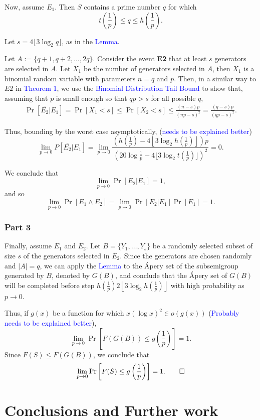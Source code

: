 Now, assume $E_1$. Then $S$ contains a prime number $q$ for which 
\[t\left(\frac{1}{p}\right) \leq q \leq h\left(\frac{1}{p}\right).\]
\par Let $s = 4\lfloor3\log_2 q \rfloor$, as in the \textcolor{blue}{Lemma}. 
\par Let $A := \{q + 1, q + 2, \ldots,  2q\}$. Consider the event \textbf{E2} that at least $s$ generators are selected in $A$. Let $X_1$ be the number of generators selected in $A$, then $X_1$ is a binomial random variable with parameters $n = q$ and $p$. Then, in a similar way to $E2$ in \textcolor{blue}{Theorem 1}, we use the \textcolor{blue}{Binomial Distribution Tail Bound} to show that, assuming that $p$ is small enough so that $qp > s$ for all possible $q$,
\begin{align*}
    \Pr[ \overline{E_2}  | E_1] = \Pr\left[X_1 < s\right] \leq \Pr\left[X_2 < s\right] \leq \frac{(n - s)p}{(np - s)^2} = \frac{(q - s)p}{(qp - s)^2}.
\end{align*}
\par Thus, bounding by the worst case asymptotically, (\textcolor{blue}{needs to be explained better})
\[\lim_{p \to 0} P[\overline{E_2} | E_1] =  \lim_{p \to 0}\frac{\left(h\left(\frac{1}{p}\right) - 4\left\lfloor3\log_2 h\left(\frac{1}{p}\right) \right\rfloor\right)p}{\left(20 \log \frac{1}{p} - 4\lfloor3\log_2 t\left(\frac{1}{p}\right) \rfloor\right)^2} = 0.\]
\par We conclude that
\[\lim_{p \to 0} \Pr[E_2 | E_1] = 1,\]
and so
\[\lim_{p \to 0} \Pr[E_1 \land E_2] = \lim_{p \to 0} \Pr[E_2  | E_1]\Pr[E_1] = 1.\]


\subsubsection*{Part 3}

\par Finally, assume $E_1$ and $E_2$. Let $B = \{Y_{1}, \ldots, Y_{s}\}$ be a randomly selected subset of size $s$ of the generators selected in $E_2$.  Since the generators are chosen randomly and $|A| = q$, we can apply the \textcolor{blue}{Lemma} to the Ápery set of the subsemigroup generated by $B$, denoted by $G(B)$, and conclude that the Ápery set of $G(B)$ will be completed before step $h\left(\frac{1}{p}\right)2\left\lfloor 3\log_2 h\left(\frac{1}{p}\right)\right\rfloor$ with high probability as $p \to 0$. 
\par Thus, if $g(x)$ be a function for which $x(\log x)^2 \in o(g(x))$ (\textcolor{blue}{Probably needs to be explained better}),
\[\lim_{p \to  0} \Pr\left[F(G(B)) \leq g\left(\frac{1}{p}\right)\right] = 1.\]
Since $F(S) \leq F(G(B))$, we conclude that
\[\lim_{p \to 0}\Pr\left[F(S) \leq g\left(\frac{1}{p}\right)\right] = 1. \qed \] 


\section{Conclusions and Further work}
